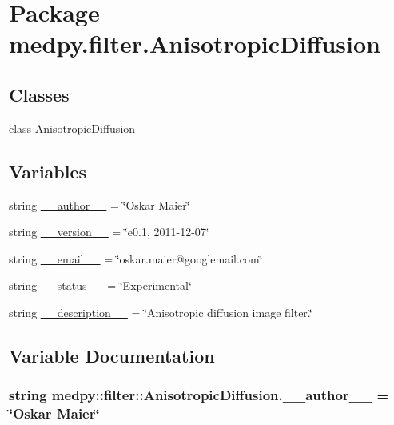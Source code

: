 \hypertarget{namespacemedpy_1_1filter_1_1AnisotropicDiffusion}{
\section{Package medpy.filter.AnisotropicDiffusion}
\label{namespacemedpy_1_1filter_1_1AnisotropicDiffusion}
}
\subsection*{Classes}
\begin{DoxyCompactItemize}
\item 
class \hyperlink{classmedpy_1_1filter_1_1AnisotropicDiffusion_1_1AnisotropicDiffusion}{AnisotropicDiffusion}
\end{DoxyCompactItemize}
\subsection*{Variables}
\begin{DoxyCompactItemize}
\item 
string \hyperlink{namespacemedpy_1_1filter_1_1AnisotropicDiffusion_ae5a4300aa9d028e5e3e7a66d15700ceb}{\_\-\_\-author\_\-\_\-} = \char`\"{}Oskar Maier\char`\"{}
\item 
string \hyperlink{namespacemedpy_1_1filter_1_1AnisotropicDiffusion_ab382efe3e2502ac55440e5a0223550b8}{\_\-\_\-version\_\-\_\-} = \char`\"{}e0.1, 2011-\/12-\/07\char`\"{}
\item 
string \hyperlink{namespacemedpy_1_1filter_1_1AnisotropicDiffusion_a4d14a658be3b72784503acfb1db89fb3}{\_\-\_\-email\_\-\_\-} = \char`\"{}oskar.maier@googlemail.com\char`\"{}
\item 
string \hyperlink{namespacemedpy_1_1filter_1_1AnisotropicDiffusion_ad9fcbb3bdb2cd4b52a9222ea58797167}{\_\-\_\-status\_\-\_\-} = \char`\"{}Experimental\char`\"{}
\item 
string \hyperlink{namespacemedpy_1_1filter_1_1AnisotropicDiffusion_a97363b241e5808e1609eee07cddb12fa}{\_\-\_\-description\_\-\_\-} = \char`\"{}Anisotropic diffusion image filter.\char`\"{}
\end{DoxyCompactItemize}


\subsection{Variable Documentation}
\hypertarget{namespacemedpy_1_1filter_1_1AnisotropicDiffusion_ae5a4300aa9d028e5e3e7a66d15700ceb}{
\subsubsection[{\_\-\_\-author\_\-\_\-}]{\setlength{\rightskip}{0pt plus 5cm}string {\bf medpy::filter::AnisotropicDiffusion.\_\-\_\-author\_\-\_\-} = \char`\"{}Oskar Maier\char`\"{}}}
\label{namespacemedpy_1_1filter_1_1AnisotropicDiffusion_ae5a4300aa9d028e5e3e7a66d15700ceb}


